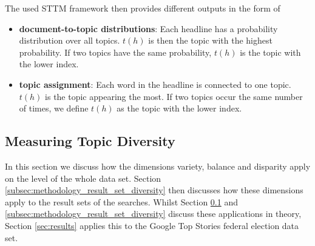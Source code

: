 

    The used STTM framework then provides different outputs in the form of 
    \begin{itemize}
        \item \textbf{document-to-topic distributions}: Each headline has a probability distribution over all topics. $t(h)$ is then the topic with the highest probability. If two topics have the same probability, $t(h)$ is the topic with the lower index. 
        
        \item \textbf{topic assignment}: Each word in the headline is connected to one topic. $t(h)$ is the topic appearing the most. If two topics occur the same number of times, we define $t(h)$ as the topic with the lower index. 
    \end{itemize}




\subsection{Measuring Topic Diversity} %
\label{subsec:methodology_data_set_diversity}

In this section we discuss how the dimensions variety, balance and disparity apply on the level of the whole data set. Section \ref{subsec:methodology_result_set_diversity} then discusses how these dimensions apply to the result sets of the searches. Whilst Section \ref{subsec:methodology_data_set_diversity} and \ref{subsec:methodology_result_set_diversity} discuss these applications in theory, Section \ref{sec:results} applies this to the Google Top Stories federal election data set.

